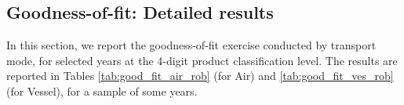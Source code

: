 \documentclass[a4paper,11pt]{article}
\begin{document}
\subsection{Goodness-of-fit: Detailed results \label{app:robust_4d}}

In this section, we report the goodness-of-fit exercise conducted by transport mode, for selected years at the 4-digit product classification level. The results are reported in Tables \ref{tab:good_fit_air_rob} (for Air) and \ref{tab:good_fit_ves_rob} (for Vessel), for a sample of some years.
\begin{table}[htbp]
  \centering
  \caption{Air: Measures of Goodness-of-fit, 4-digits}
\begin{center}
\label{tab:good_fit_air_rob}%
\end{center}
\end{table}
\end{document}
